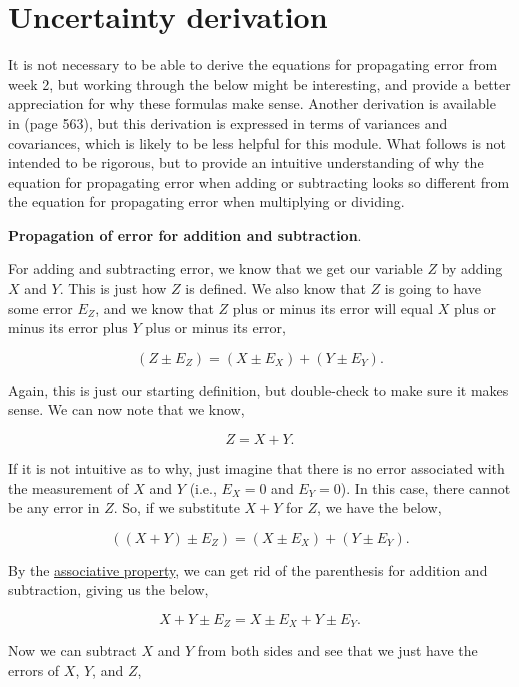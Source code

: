 \documentclass[
]{scrbook}
\begin{document}
\hypertarget{uncertainty_derivation}{%
\chapter{Uncertainty derivation}\label{uncertainty_derivation}}

It is not necessary to be able to derive the equations for propagating error from week 2, but working through the below might be interesting, and provide a better appreciation for why these formulas make sense.
Another derivation is available in \citet{Box1978} (page 563), but this derivation is expressed in terms of variances and covariances, which is likely to be less helpful for this module.
What follows is not intended to be rigorous, but to provide an intuitive understanding of why the equation for propagating error when adding or subtracting looks so different from the equation for propagating error when multiplying or dividing.

\textbf{Propagation of error for addition and subtraction}.

For adding and subtracting error, we know that we get our variable \(Z\) by adding \(X\) and \(Y\). This is just how \(Z\) is defined. We also know that \(Z\) is going to have some error \(E_Z\), and we know that \(Z\) plus or minus its error will equal \(X\) plus or minus its error plus \(Y\) plus or minus its error,

\[(Z \pm E_Z) = (X  \pm E_X) + (Y \pm E_Y).\]

Again, this is just our starting definition, but double-check to make sure it makes sense. We can now note that we know,

\[Z =X+Y.\]

If it is not intuitive as to why, just imagine that there is no error associated with the measurement of \(X\) and \(Y\) (i.e., \(E_{X} = 0\) and \(E_{Y} = 0\)).
In this case, there cannot be any error in \(Z\). So, if we substitute \(X + Y\) for \(Z\), we have the below,

\[((X + Y) \pm E_Z) = (X  \pm E_X) + (Y \pm E_Y).\]

By the \href{https://en.wikipedia.org/wiki/Associative_property}{associative property}, we can get rid of the parenthesis for addition and subtraction, giving us the below,

\[X + Y \pm E_Z = X  \pm E_X + Y \pm E_Y.\]

Now we can subtract \(X\) and \(Y\) from both sides and see that we just have the errors of \(X\), \(Y\), and \(Z\),
\end{document}
